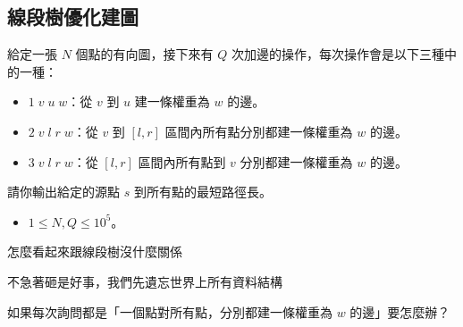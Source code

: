 \subsection{線段樹優化建圖}

\begin{frame}{\ectitle}
    \begin{problem}
        給定一張 $N$ 個點的有向圖，接下來有 $Q$ 次加邊的操作，每次操作會是以下三種中的一種：
        \begin{itemize}
            \item $1\;v\;u\;w$：從 $v$ 到 $u$ 建一條權重為 $w$ 的邊。
            \item $2\;v\;l\;r\;w$：從 $v$ 到 $[l,r]$ 區間內所有點分別都建一條權重為 $w$ 的邊。
            \item $3\;v\;l\;r\;w$：從 $[l,r]$ 區間內所有點到 $v$ 分別都建一條權重為 $w$ 的邊。
        \end{itemize}
        請你輸出給定的源點 $s$ 到所有點的最短路徑長。
        \begin{itemize}
            \item $1 \le N,Q \le 10^5$。
        \end{itemize}
    \end{problem}
\end{frame}

\begin{frame}{\ectitle}
    怎麼看起來跟線段樹沒什麼關係

    不急著砸是好事，我們先遺忘世界上所有資料結構
\end{frame}

\begin{frame}{\ectitle}
    如果每次詢問都是「一個點對所有點，分別都建一條權重為 $w$ 的邊」要怎麼辦？

    \begin{figure}[h!]
        \begin{center}
        \end{center}
    \end{figure}
\end{frame}

